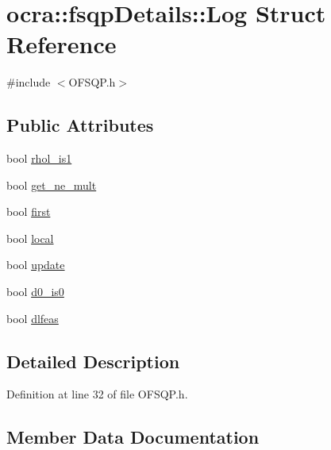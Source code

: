 \hypertarget{structocra_1_1fsqpDetails_1_1Log}{}\section{ocra\+:\+:fsqp\+Details\+:\+:Log Struct Reference}
\label{structocra_1_1fsqpDetails_1_1Log}


{\ttfamily \#include $<$O\+F\+S\+Q\+P.\+h$>$}

\subsection*{Public Attributes}
\begin{DoxyCompactItemize}
\item 
bool \hyperlink{structocra_1_1fsqpDetails_1_1Log_a9538a5454c767ecb63620f4b36d72676}{rhol\+\_\+is1}
\item 
bool \hyperlink{structocra_1_1fsqpDetails_1_1Log_aadc61b25f57b2277b7431ecedc29c6b4}{get\+\_\+ne\+\_\+mult}
\item 
bool \hyperlink{structocra_1_1fsqpDetails_1_1Log_add5ea7abffed65d8e168c8f47317c9bc}{first}
\item 
bool \hyperlink{structocra_1_1fsqpDetails_1_1Log_a17e784308319e498ceaf11b4b809df52}{local}
\item 
bool \hyperlink{structocra_1_1fsqpDetails_1_1Log_abb57457b6ee98f85e51eff3b56797668}{update}
\item 
bool \hyperlink{structocra_1_1fsqpDetails_1_1Log_a66091f6ab3b26727a8bb20be11997af7}{d0\+\_\+is0}
\item 
bool \hyperlink{structocra_1_1fsqpDetails_1_1Log_ab99dfa8d9e4586ab424df50710ae3961}{dlfeas}
\end{DoxyCompactItemize}


\subsection{Detailed Description}


Definition at line 32 of file O\+F\+S\+Q\+P.\+h.



\subsection{Member Data Documentation}
\hypertarget{structocra_1_1fsqpDetails_1_1Log_a66091f6ab3b26727a8bb20be11997af7}{}\label{structocra_1_1fsqpDetails_1_1Log_a66091f6ab3b26727a8bb20be11997af7} 
